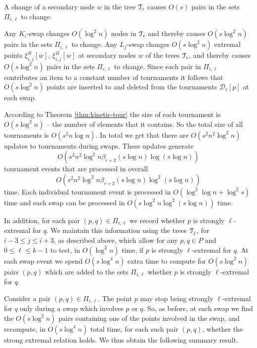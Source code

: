 \documentclass[letter,11pt]{article}
\def\dirtour{{\mathcal D}}
\def\T{\EuScript{T}}
\begin{document}
  A change
of a secondary node $w$ in the tree $\T_i$ causes
 $O(s)$ pairs in the sets $\Pi_{i,\ell}$
to change.


Any $K_i$-swap changes 
$O(\log^2 n)$ nodes in 
  $\T_i$ and thereby causes $O(s\log^2 n)$ pairs in the sets $\Pi_{i,\ell}$
to change. 
Any $L_j$-swap changes $O(s\log^2 n)$ extremal points $\xi_{i,j}^R[w]$,
$\xi_{i,j}^B[w]$ at secondary nodes $w$ of the trees $\T_i$, and thereby  causes 
 $O(s\log^2 n)$ pairs in the sets $\Pi_{i,\ell}$
to change. Since each pair in $\Pi_{i,\ell}$ contributes an item to a constant
number of tournaments it follows that 
$O(s\log^2n)$ points are inserted to and deleted from
the tournaments $\dirtour_\ell[p]$ at each swap.


According to Theorem \ref{thm:kinetic-tour}
the size of each tournament is $O(s\log^2 n)$ -- the number
of elements that it contains. So the total size of all tournaments
is $O(s^2n\log n)$. In total we get that there are 
$O(s^2n^2 \log^2 n)$ updates to tournaments during swaps.
These updates generate 
$$
O(s^2n^2\log^2n\beta_{r+2}(s\log n)\log(s\log n))$$ 
tournament events
that are processed in overall
$$
O(s^2n^2\log^2n\beta_{r+2}(s\log n)\log^2(s\log n))
$$ 
time.
Each  individual tournament event 
is processed in $O(\log^2\log n + \log^2 s)$ time and each swap
can be processed in  $O(s\log^2n\log^2(s\log n))$
time.


\smallskip

In addition, for each pair $(p,q)\in \Pi_{i,\ell}$
we record whether $p$ is strongly
$\ell$-extremal for $q$.
We maintain this information using the 
trees $\T_j$, for $i-3\leq j\leq i+3$, as described above, which allow
for any $p,q\in P$ and $0\leq \ell\leq k-1$ to test, in $O(\log^2n)$
time, if $p$ is strongly $\ell$-extremal for $q$.  At each swap event
we spend $O(s\log^4n)$ extra time to compute for
$O(s\log^2n)$ pairs $(p,q)$ which are added to the sets $\Pi_{i,\ell}$
whether $p$ is strongly
$\ell$-extremal for $q$.


Consider a pair $(p,q) \in \Pi_{i,\ell}$. The point $p$ may stop being
strongly
$\ell$-extremal for $q$ only during a swap which involves $p$ 
or $q$. So, as before, at each swap we find the $O(s\log^2n)$ pairs
containing one of the points involved in the swap, and recompute, in $O(s\log^4n)$
total time,
for each such pair $(p,q)$, whether
the strong extremal relation holds. 
 We thus obtain the following summary result.
\end{document}
